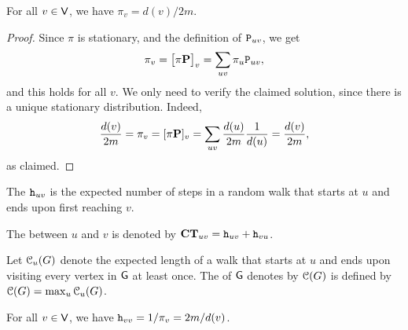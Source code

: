 \begin{lemma}
    For all $v \in \mathsf{V}$, we have $\pi_v = d(v) / 2m$.
\end{lemma}

\begin{proof}
    Since $\pi$ is stationary, and the definition of $\mathtt{P}_{uv}$,
    we get
    \begin{align*}
      \pi_v = \left[ {\pi \mathbf{P} } \bigr. \right]_v = \sum_{uv} \pi_u
      \mathtt{P}_{uv},
    \end{align*}
    and this holds for all $v$. We only need to verify the claimed
    solution, since there is a unique stationary distribution. Indeed,
    \begin{align*}
        \frac{d(v)}{2m} = \pi_v = [\pi \mathbf{P} ]_v = \sum_{uv}
        \frac{d(u)}{2m} \frac{1}{d(u)} = \frac{d(v)}{2m},
    \end{align*}
    as claimed.
\end{proof}

\begin{defn}
    The  $\mathtt{h}_{uv}$ is the expected number
    of steps in a random walk that starts at $u$ and ends upon first
    reaching $v$.
    
    The  between $u$ and $v$ is denoted by
    $\mathbf{CT}_{uv} = \mathtt{h}_{uv} + \mathtt{h}_{vu}$.
    
    Let $\EuScript{C}_u(G)$ denote the expected length of a walk that
    starts at $u$ and ends upon visiting every vertex in $\mathsf{G}$ at least
    once. The  of $\mathsf{G}$ denotes by $\EuScript{C}(G)$ is
    defined by $\EuScript{C}(G) = \max_u \EuScript{C}_u(G)$.
\end{defn}

\begin{lemma}
    For all $v \in \mathsf{V}$, we have $\mathtt{h}_{vv} = 1/\pi_v =
    2m/d(v)$.
\end{lemma}



